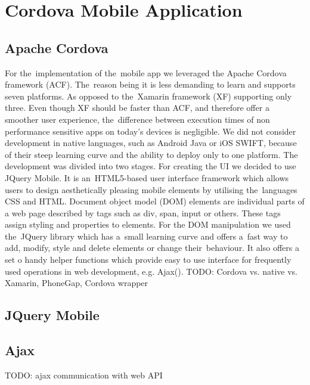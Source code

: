 \section{Cordova Mobile Application}
\subsection{Apache Cordova}
For the~implementation of the~mobile app we leveraged the Apache Cordova framework (ACF). The~reason being it is less demanding to learn and supports seven platforms. As opposed to the~Xamarin framework (XF) supporting only three. Even though XF should be faster than ACF, and therefore offer a smoother user experience, the~difference between execution times of non performance sensitive apps on today's devices is negligible. We did not consider development in native languages, such as Android Java or iOS SWIFT, because of their steep learning curve and the ability to deploy only to one platform. The development was divided into two stages. For creating the UI  we decided to use JQuery Mobile. It is an~HTML5-based user interface framework which allows users to design aesthetically pleasing mobile elements by utilising the~languages CSS and HTML. Document object model (DOM) elements are individual parts of a web page described by tags such as div, span, input or others. These tags assign styling and properties to elements. For the DOM manipulation we used the~JQuery library which has a~small learning curve and offers a~fast way to add, modify, style and delete elements or change their~behaviour. It also offers a set o handy helper functions which provide easy to use interface for frequently used operations in web development, e.g. Ajax().
TODO: Cordova vs. native vs. Xamarin, PhoneGap, Cordova wrapper
\subsection{JQuery Mobile}
\subsection{Ajax}
TODO: ajax communication with web API


